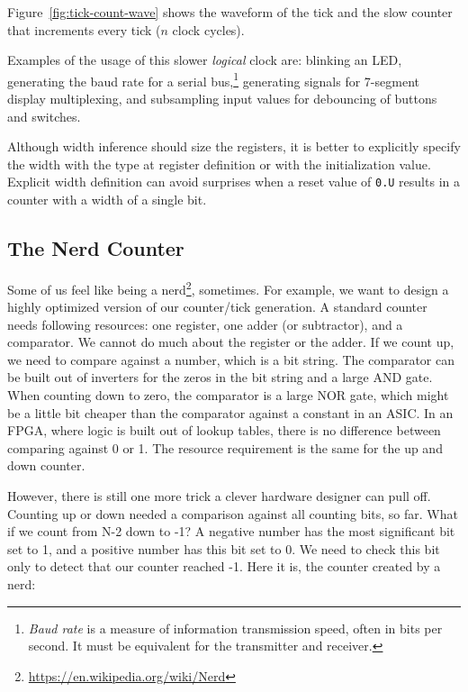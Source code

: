 \documentclass[%
    10pt,
    headinclude, footexclude,
    openright, %
    notitlepage,
    cleardoubleempty,
    headsepline,
    pointlessnumbers,
    bibtotoc, idxtotoc,
    ]{scrbook}
\newcommand{\code}[1]{{\lstinline[basicstyle=\small\ttfamily]{#1}}}
\newcommand{\myref}[2]{\href{#1}{#2}}
\renewcommand{\myref}[2]{{#2}{\footnote{\url{#1}}}}
\begin{document}
\noindent Figure~\ref{fig:tick-count-wave} shows the waveform of the tick and the
slow counter that increments every tick ($n$ clock cycles).

Examples of the usage of this slower \emph{logical} clock are: blinking an LED,
generating the baud rate for a serial bus,\footnote{\textit{Baud rate} is a measure of
information transmission speed, often in bits per second. It must be equivalent for 
the transmitter and receiver.} generating signals for 7-segment
display multiplexing, and subsampling input values for debouncing of buttons
and switches.

Although width inference should size the registers, it is better to explicitly
specify the width with the type at register definition or with the
initialization value. Explicit width definition can avoid surprises when a reset value of \code{0.U}
results in a counter with a width of a single bit.

\subsection{The Nerd Counter}

Some of us feel like being a \myref{https://en.wikipedia.org/wiki/Nerd}{nerd}, sometimes.
For example, we want to design a highly optimized version of our counter/tick generation.
A standard counter needs following resources: one register, one adder (or subtractor),
and a comparator. We cannot do much about the register or the adder. If we count
up, we need to compare against a number, which is a bit string. The comparator
can be built out of inverters for the zeros in the bit string and a large AND gate.
When counting down to zero, the comparator is a large NOR gate, which might be
a little bit cheaper than the comparator against a constant in an ASIC.
In an FPGA, where logic is built out of lookup tables, there is no difference between comparing
against 0 or 1. The resource requirement is the same for the up and down counter.

However, there is still one more trick a clever hardware designer can pull off.
Counting up or down needed a comparison against all counting bits, so far.
What if we count from N-2 down to -1? A negative number has the most significant bit
set to 1, and a positive number has this bit set to 0. We need to check this bit only to detect
that our counter reached -1. Here it is, the counter created by a nerd:

\end{document}
